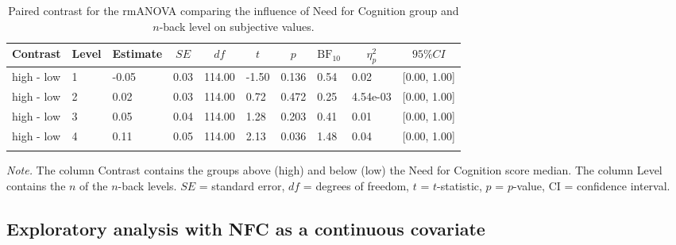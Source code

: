 \documentclass[
  man,floatsintext]{apa6}
\begin{document}
\begin{table}[H]

\begin{center}
\begin{threeparttable}

\caption{\label{tab:unnamed-chunk-17}Paired contrast for the rmANOVA comparing the influence of Need for Cognition group and $n$-back level on subjective values.}

\begin{tabular}{llllllllll}
\toprule
Contrast & \multicolumn{1}{c}{Level} & \multicolumn{1}{c}{Estimate} & \multicolumn{1}{c}{$SE$} & \multicolumn{1}{c}{$df$} & \multicolumn{1}{c}{$t$} & \multicolumn{1}{c}{$p$} & \multicolumn{1}{c}{$\mathrm{BF}_{\textrm{10}}$} & \multicolumn{1}{c}{$\eta_{p}^{2}$} & \multicolumn{1}{c}{$95\% CI$}\\
\midrule
high - low & 1 & -0.05 & 0.03 & 114.00 & -1.50 & 0.136 & 0.54 & 0.02 & {}[0.00, 1.00]\\
high - low & 2 & 0.02 & 0.03 & 114.00 & 0.72 & 0.472 & 0.25 & 4.54e-03 & {}[0.00, 1.00]\\
high - low & 3 & 0.05 & 0.04 & 114.00 & 1.28 & 0.203 & 0.41 & 0.01 & {}[0.00, 1.00]\\
high - low & 4 & 0.11 & 0.05 & 114.00 & 2.13 & 0.036 & 1.48 & 0.04 & {}[0.00, 1.00]\\
\bottomrule
\addlinespace
\end{tabular}

\begin{tablenotes}[para]
\normalsize{\textit{Note.} The column Contrast contains the groups above (high) and below (low) the Need for Cognition score median. The column Level contains the $n$ of the $n$-back levels. $SE$ = standard error, $df$ = degrees of freedom, $t$ = $t$-statistic, $p$ = $p$-value, CI = confidence interval.}
\end{tablenotes}

\end{threeparttable}
\end{center}

\end{table}

\newpage

\hypertarget{exploratory-analysis-with-nfc-as-a-continuous-covariate}{%
\subsection{Exploratory analysis with NFC as a continuous covariate}\label{exploratory-analysis-with-nfc-as-a-continuous-covariate}}
\end{document}
